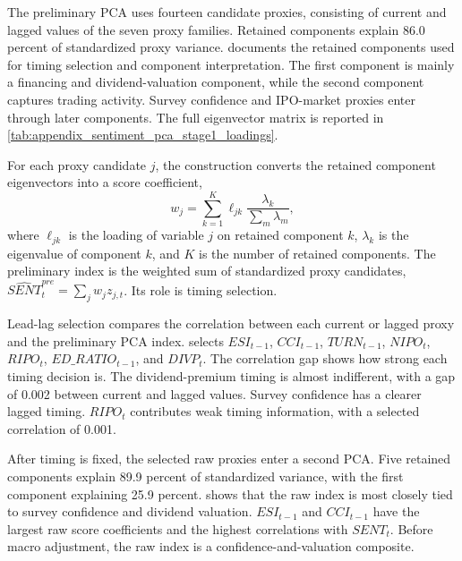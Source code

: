 \documentclass[11pt]{article}
\newcommand{\var}[1]{\ensuremath{#1}}
\begin{document}
The preliminary PCA uses fourteen candidate proxies, consisting of current and lagged values of the seven proxy families. Retained components explain 86.0 percent of standardized proxy variance.  documents the retained components used for timing selection and component interpretation. The first component is mainly a financing and dividend-valuation component, while the second component captures trading activity. Survey confidence and IPO-market proxies enter through later components. The full eigenvector matrix is reported in \cref{tab:appendix_sentiment_pca_stage1_loadings}.


For each proxy candidate \(j\), the construction converts the retained component eigenvectors into a score coefficient,
\begin{equation}
    w_j = \sum_{k=1}^{K} \ell_{jk}\frac{\lambda_k}{\sum_m \lambda_m},
\end{equation}
where \(\ell_{jk}\) is the loading of variable \(j\) on retained component \(k\), \(\lambda_k\) is the eigenvalue of component \(k\), and \(K\) is the number of retained components. The preliminary index is the weighted sum of standardized proxy candidates, \(\widehat{SENT}^{pre}_t=\sum_j w_j z_{j,t}\). Its role is timing selection.

Lead-lag selection compares the correlation between each current or lagged proxy and the preliminary PCA index.  selects \var{ESI_{t-1}}, \var{CCI_{t-1}}, \var{TURN_{t-1}}, \var{NIPO_t}, \var{RIPO_t}, \var{ED\_RATIO_{t-1}}, and \var{DIVP_t}. The correlation gap shows how strong each timing decision is. The dividend-premium timing is almost indifferent, with a gap of 0.002 between current and lagged values. Survey confidence has a clearer lagged timing. \var{RIPO_t} contributes weak timing information, with a selected correlation of 0.001.


After timing is fixed, the selected raw proxies enter a second PCA. Five retained components explain 89.9 percent of standardized variance, with the first component explaining 25.9 percent.  shows that the raw index is most closely tied to survey confidence and dividend valuation. \var{ESI_{t-1}} and \var{CCI_{t-1}} have the largest raw score coefficients and the highest correlations with \var{SENT_t}. Before macro adjustment, the raw index is a confidence-and-valuation composite.
\end{document}
